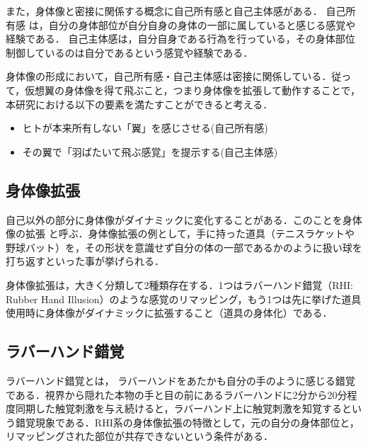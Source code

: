 \begin{small}
    また，身体像と密接に関係する概念に自己所有感と自己主体感がある．
    自己所有感 は，自分の身体部位が自分自身の身体の一部に属していると感じる感覚や経験である．
    自己主体感は，自分自身である行為を行っている，その身体部位制御しているのは自分であるという感覚や経験である．

    身体像の形成において，自己所有感・自己主体感は密接に関係している．従って，仮想翼の身体像を得て飛ぶこと，つまり身体像を拡張して動作することで，本研究における以下の要素を満たすことができると考える．

    \begin{itemize}
        \item ヒトが本来所有しない「翼」を感じさせる(自己所有感)
        \item その翼で「羽ばたいて飛ぶ感覚」を提示する(自己主体感)
    \end{itemize}

  \subsection{身体像拡張}

    自己以外の部分に身体像がダイナミックに変化することがある．このことを身体像の拡張
    と呼ぶ．身体像拡張の例として，手に持った道具（テニスラケットや野球バット）を，その形状を意識せず自分の体の一部であるかのように扱い球を打ち返すといった事が挙げられる．

    身体像拡張は，大きく分類して2種類存在する．1つはラバーハンド錯覚（RHI: Rubber Hand Illusion）\cite{botvinick1998rubber}のような感覚のリマッピング，もう1つは先に挙げた道具使用時に身体像がダイナミックに拡張すること（道具の身体化）である．

    \subsection{ラバーハンド錯覚} %
      ラバーハンド錯覚とは， ラバーハンドをあたかも自分の手のように感じる錯覚である．視界から隠れた本物の手と目の前にあるラバーハンドに2分から20分程度同期した触覚刺激を与え続けると，ラバーハンド上に触覚刺激を知覚するという錯覚現象である．RHI系の身体像拡張の特徴として，元の自分の身体部位と，リマッピングされた部位が共存できないという条件がある．


\end{small}
